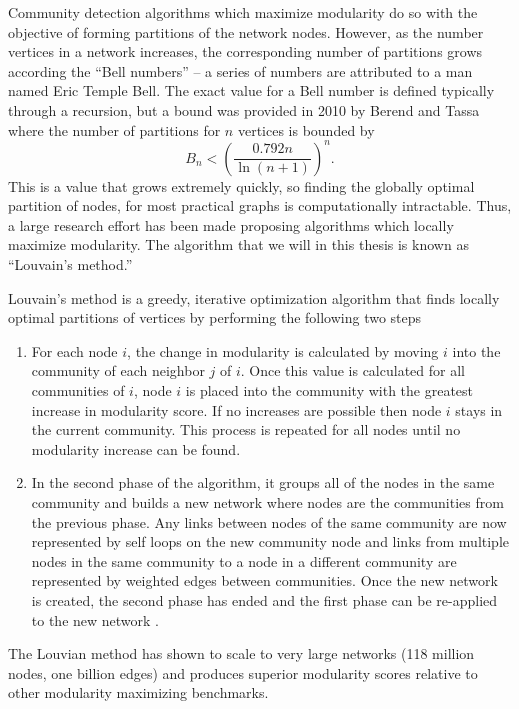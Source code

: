 \documentclass[../thesis.tex]{subfiles}
\begin{document}
Community detection algorithms which maximize modularity do so with the objective of forming partitions of the network nodes. However, as the number vertices in a network increases, the corresponding number of partitions grows according the ``Bell numbers'' -- a series of numbers are attributed to a man named Eric Temple Bell. The exact value for a Bell number is defined typically through a recursion, but a bound was provided in 2010 by Berend and Tassa \cite{berend2010improved} where the number of partitions for $n$ vertices is bounded by
\begin{equation}
    B_n < \left(\frac{0.792n}{\ln(n + 1)} \right)^n.
\end{equation}
This is a value that grows extremely quickly, so finding the globally optimal partition of nodes, for most practical graphs is computationally intractable. Thus, a large research effort has been made proposing algorithms which locally maximize modularity. The algorithm that we will in this thesis is known as ``Louvain's method.''

Louvain's method is a greedy, iterative optimization algorithm that finds locally optimal partitions of vertices by performing the following two steps
\begin{enumerate}
    \item For each node $i$, the change in modularity is calculated by moving $i$ into the community of each neighbor $j$ of $i$. Once this value is calculated for all communities of $i$, node $i$ is placed into the community with the greatest increase in modularity score. If no increases are possible then node $i$ stays in the current community. This process is repeated for all nodes until no modularity increase can be found.
    \item In the second phase of the algorithm, it groups all of the nodes in the same community and builds a new network where nodes are the communities from the previous phase. Any links between nodes of the same community are now represented by self loops on the new community node and links from multiple nodes in the same community to a node in a different community are represented by weighted edges between communities. Once the new network is created, the second phase has ended and the first phase can be re-applied to the new network \cite{blondel2008fast}.
\end{enumerate}
The Louvian method has shown to scale to very large networks (118 million nodes, one billion edges) and produces superior modularity scores relative to other modularity maximizing benchmarks.
\end{document}
